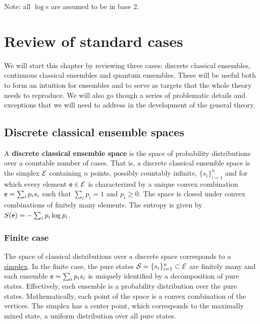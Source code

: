 Note: all $\log$s are assumed to be in base 2.

\section{Review of standard cases}

We will start this chapter by reviewing three cases: discrete classical ensembles, continuous classical ensembles and quantum ensembles. These will be useful both to form an intuition for ensembles and to serve as targets that the whole theory needs to reproduce. We will also go though a series of problematic details and exceptions that we will need to address in the development of the general theory.

\subsection{Discrete classical ensemble spaces}

\begin{defn}
	A \textbf{discrete classical ensemble space} is the space of probability distributions over a countable number of cases. That is, a discrete classical ensemble space is the simplex $\mathcal{E}$ containing $n$ points, possibly countably infinite, $\{s_i\}^n_{i=1}$ and for which every element $\mathsf{e} \in \mathcal{E}$ is characterized by a unique convex combination $\mathsf{e} = \sum_i p_i s_i$ such that $\sum_i p_i = 1$ and $p_i \geq 0$. The space is closed under convex combinations of finitely many elements. The entropy is given by $S(\mathsf{e}) = - \sum_i p_i \log p_i$.
\end{defn}

\subsubsection{Finite case}

The space of classical distributions over a discrete space corresponds to a \href{https://en.wikipedia.org/wiki/Simplex}{simplex}. In the finite case, the pure states $\mathcal{S} = \{s_i\}_{i=1}^{n} \subset \mathcal{E}$ are finitely many and each ensemble $\mathsf{e} = \sum_i p_i s_i$ is uniquely identified by a decomposition of pure states. Effectively, each ensemble is a probability distribution over the pure states. Mathematically, each point of the space is a convex combination of the vertices. The simplex has a center point, which corresponds to the maximally mixed state, a uniform distribution over all pure states. 

